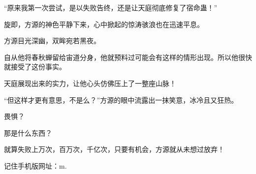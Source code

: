 \begin{this_body}
“原来我第一次尝试，是以失败告终，还是让天庭彻底修复了宿命蛊！”

旋即，方源的神色平静下来，心中掀起的惊涛骇浪也在迅速平息。

方源目光深幽，双眸宛若黑夜。

自从他将春秋蝉留给宙道分身，他就预料过可能会有这样的情形出现。所以他很快就接受了这份事实。

天庭展现出来的实力，让他心头仿佛压上了一整座山脉！

“但这样才更有意思，不是么？”方源的眼中流露出一抹笑意，冰冷且又狂热。

畏惧？

那是什么东西？

就算失败上万次，百万次，千亿次，只要有机会，方源就从未想过放弃！

记住手机版网址：m.

\end{this_body}

